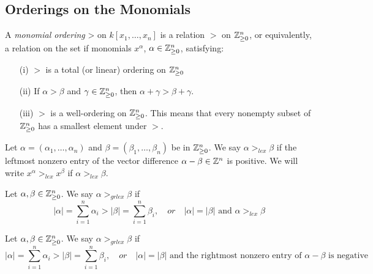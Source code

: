 \subsection{Orderings on the Monomials}

\begin{definition}
    A \textit{monomial ordering} > on $k[x_1, \dots, x_n]$ is a relation $>$ on $\mathbb{Z}^n_{\geq 0}$, or equivalently, a relation on the set if monomials $x^{\alpha}$, $\alpha \in \mathbb{Z}^n_{\geq 0}$, satisfying:
    \begin{enumerate}
        \item[(i)] $>$ is a total (or linear) ordering on $\mathbb{Z}^n_{\geq 0}$
        \item[(ii)] If $\alpha > \beta$ and $\gamma \in \mathbb{Z}^n_{\geq 0}$, then $\alpha + \gamma > \beta + \gamma$.
        \item[(iii)] $>$ is a well-ordering on $\mathbb{Z}^n_{\geq 0}$.
            This means that every nonempty subset of $\mathbb{Z}^n_{\geq 0}$ has a smallest element under $>$.
    \end{enumerate}
\end{definition}

\begin{definition}
    Let $\alpha = (\alpha_1, \dots, \alpha_n)$ and $\beta = (\beta_1, \dots, \beta_n)$ be in $\mathbb{Z}^n_{\geq 0}$.
    We say $\alpha >_{lex} \beta$ if the leftmost nonzero entry of the vector difference $\alpha - \beta \in \mathbb{Z}^n$ is positive.
    We will write $x^{\alpha} >_{lex} x^{\beta}$ if $\alpha >_{lex} \beta$.
\end{definition}

\begin{definition}
    Let $\alpha, \beta \in \mathbb{Z}^n_{\geq 0}$.
    We say $\alpha >_{grlex} \beta$ if
    $$|\alpha| = \sum_{i=1}^n \alpha_i > |\beta| = \sum_{i=1}^n \beta_i, \quad or \quad |\alpha | = | \beta | \text{ and } \alpha >_{lex} \beta$$
\end{definition}

\begin{definition}
    Let $\alpha, \beta \in \mathbb{Z}^n_{\geq 0}$.
    We say $\alpha >_{grlex} \beta$ if
    $$|\alpha| = \sum_{i=1}^n \alpha_i > |\beta| = \sum_{i=1}^n \beta_i, \quad or \quad |\alpha | = | \beta | \text{ and the rightmost nonzero entry of } \alpha - \beta \text{ is negative }$$
\end{definition}

